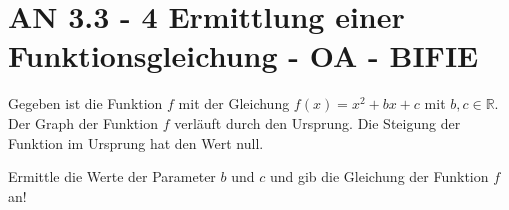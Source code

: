 \section{AN 3.3 - 4 Ermittlung einer Funktionsgleichung - OA - BIFIE}

\begin{beispiel}[AN 3.3]{1} %
				Gegeben ist die Funktion $f$ mit der Gleichung $f(x)=x^2+bx+c$ mit $b,c\in\mathbb{R}$.
Der Graph der Funktion $f$ verläuft durch den Ursprung. Die Steigung der Funktion im Ursprung hat den Wert null.

Ermittle die Werte der Parameter $b$ und $c$ und gib die Gleichung der Funktion $f$ an!
\leer

\end{beispiel}
